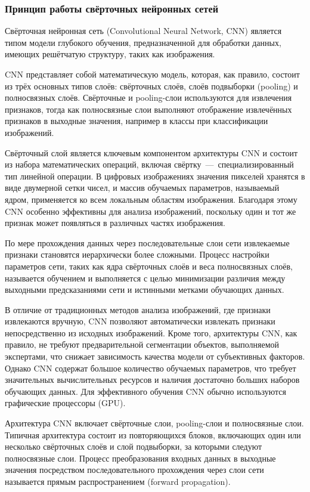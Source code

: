 \subsubsection{Принцип работы свёрточных нейронных сетей}

Свёрточная нейронная сеть (Convolutional Neural Network, CNN) является типом модели глубокого обучения, предназначенной для обработки данных, имеющих решётчатую структуру, таких как изображения.

CNN представляет собой математическую модель, которая, как правило, состоит из трёх основных типов слоёв: свёрточных слоёв, слоёв подвыборки (pooling) и полносвязных слоёв. Свёрточные и pooling-слои используются для извлечения признаков, тогда как полносвязные слои выполняют отображение извлечённых признаков в выходные значения, например в классы при классификации изображений.

Свёрточный слой является ключевым компонентом архитектуры CNN и состоит из набора математических операций, включая свёртку~---~специализированный тип линейной операции. В цифровых изображениях значения пикселей хранятся в виде двумерной сетки чисел, и массив обучаемых параметров, называемый ядром, применяется ко всем локальным областям изображения. Благодаря этому CNN особенно эффективны для анализа изображений, поскольку один и тот же признак может появляться в различных частях изображения.

По мере прохождения данных через последовательные слои сети извлекаемые признаки становятся иерархически более сложными. Процесс настройки параметров сети, таких как ядра свёрточных слоёв и веса полносвязных слоёв, называется обучением и выполняется с целью минимизации различия между выходными предсказаниями сети и истинными метками обучающих данных.

В отличие от традиционных методов анализа изображений, где признаки извлекаются вручную, CNN позволяют автоматически извлекать признаки непосредственно из исходных изображений. Кроме того, архитектуры CNN, как правило, не требуют предварительной сегментации объектов, выполняемой экспертами, что снижает зависимость качества модели от субъективных факторов. Однако CNN содержат большое количество обучаемых параметров, что требует значительных вычислительных ресурсов и наличия достаточно больших наборов обучающих данных. Для эффективного обучения CNN обычно используются графические процессоры (GPU).

Архитектура CNN включает свёрточные слои, pooling-слои и полносвязные слои. Типичная архитектура состоит из повторяющихся блоков, включающих один или несколько свёрточных слоёв и слой подвыборки, за которыми следуют полносвязные слои. Процесс преобразования входных данных в выходные значения посредством последовательного прохождения через слои сети называется прямым распространением (forward propagation).

